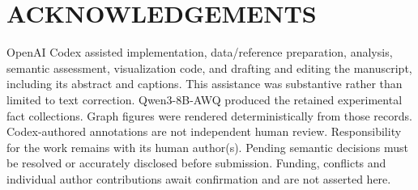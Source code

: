 \section*{ACKNOWLEDGEMENTS}
OpenAI Codex assisted implementation, data/reference preparation, analysis,
semantic assessment, visualization code, and drafting and editing the manuscript,
including its abstract and captions. This assistance was substantive rather than
limited to text correction. Qwen3-8B-AWQ produced the retained experimental fact
collections. Graph figures were rendered deterministically from those records.
Codex-authored annotations are not independent human review. Responsibility for
the work remains with its human author(s). Pending semantic decisions must be
resolved or accurately disclosed before submission. Funding, conflicts and
individual author contributions await confirmation and are not asserted here.
